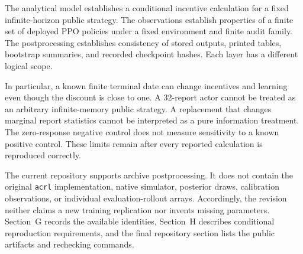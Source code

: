 \documentclass{article}
\begin{document}
The analytical model establishes a conditional incentive calculation for a fixed infinite-horizon public strategy. The observations establish properties of a finite set of deployed PPO policies under a fixed environment and finite audit family. The postprocessing establishes consistency of stored outputs, printed tables, bootstrap summaries, and recorded checkpoint hashes. Each layer has a different logical scope.

In particular, a known finite terminal date can change incentives and learning even though the discount is close to one. A 32-report actor cannot be treated as an arbitrary infinite-memory public strategy. A replacement that changes marginal report statistics cannot be interpreted as a pure information treatment. The zero-response negative control does not measure sensitivity to a known positive control. These limits remain after every reported calculation is reproduced correctly.

The current repository supports archive postprocessing. It does not contain the original \texttt{acrl} implementation, native simulator, posterior draws, calibration observations, or individual evaluation-rollout arrays. Accordingly, the revision neither claims a new training replication nor invents missing parameters. Section~G records the available identities, Section~H describes conditional reproduction requirements, and the final repository section lists the public artifacts and rechecking commands.


\end{document}
